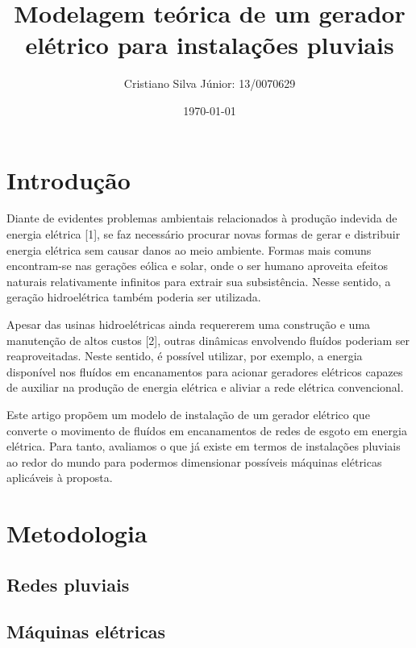 \documentclass[12pt, a4paper, twoside]{article}
\begin{document}
\title{Modelagem teórica de um gerador elétrico para instalações pluviais}
\author{Cristiano Silva Júnior: 13/0070629}
\date{\today}
\maketitle

\section{Introdução}

Diante de evidentes problemas ambientais relacionados à produção indevida de
energia elétrica [1], se faz necessário procurar novas formas de gerar e
distribuir energia elétrica sem causar danos ao meio ambiente. Formas mais
comuns encontram-se nas gerações eólica e solar, onde o ser humano aproveita
efeitos naturais relativamente infinitos para extrair sua subsistência. Nesse
sentido, a geração hidroelétrica também poderia ser utilizada.

Apesar das usinas hidroelétricas ainda requererem uma construção e uma
manutenção de altos custos [2], outras dinâmicas envolvendo fluídos poderiam
ser reaproveitadas. Neste sentido, é possível utilizar, por exemplo, a energia
disponível nos fluídos em encanamentos para acionar geradores elétricos capazes
de auxiliar na produção de energia elétrica e aliviar a rede elétrica
convencional.

Este artigo propõem um modelo de instalação de um gerador elétrico que converte
o movimento de fluídos em encanamentos de redes de esgoto em energia elétrica.
Para tanto, avaliamos o que já existe em termos de instalações pluviais ao
redor do mundo para podermos dimensionar possíveis máquinas elétricas
aplicáveis à proposta.

\section{Metodologia}

\subsection{Redes pluviais}




\subsection{Máquinas elétricas}
\end{document}
